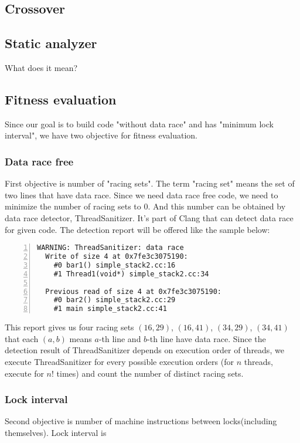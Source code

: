 \documentclass[sigconf]{acmart}
\begin{document}
\subsection{Crossover}

\subsection{Static analyzer}
What does it mean?

\subsection{Fitness evaluation}
Since our goal is to build code "without data race" and has "minimum lock interval", we have two objective for fitness evaluation. 

\subsubsection{Data race free}
First objective is number of "racing sets". The term "racing set" means the set of two lines that have data race. Since we need data race free code, we need to minimize the number of racing sets to 0. And this number can be obtained by data race detector, ThreadSanitizer. It's part of Clang that can detect data race for given code. The detection report will be offered like the sample below:

\begin{lstlisting}[frame=tb, xleftmargin=2em, framexleftmargin=1.5em, numbers=left]
WARNING: ThreadSanitizer: data race
  Write of size 4 at 0x7fe3c3075190:
    #0 bar1() simple_stack2.cc:16
    #1 Thread1(void*) simple_stack2.cc:34

  Previous read of size 4 at 0x7fe3c3075190:
    #0 bar2() simple_stack2.cc:29
    #1 main simple_stack2.cc:41
\end{lstlisting}

This report gives us four racing sets $(16, 29)$, $(16, 41)$, $(34, 29)$, $(34, 41)$ that each $(a, b)$ means $a$-th line and $b$-th line have data race. Since the detection result of ThreadSanitizer depends on execution order of threads, we execute ThreadSanitizer for every possible execution orders (for $n$ threads, execute for $n!$ times) and count the number of distinct racing sets.
 
\subsubsection{Lock interval}
Second objective is number of machine instructions between locks(including themselves). Lock interval is 
\end{document}
